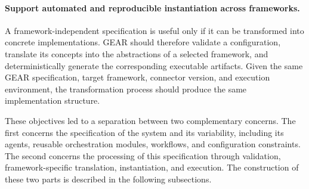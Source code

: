 \paragraph{\textbf{Support automated and reproducible instantiation
across frameworks.}}
A framework-independent specification is useful only if it can be
transformed into concrete implementations. GEAR should therefore validate a
configuration, translate its concepts into the abstractions of a selected
framework, and deterministically generate the corresponding executable
artifacts. Given the same GEAR specification, target framework, connector
version, and execution environment, the transformation process should
produce the same implementation structure.

These objectives led to a separation between two complementary concerns.
The first concerns the specification of the system and its variability,
including its agents, reusable orchestration modules, workflows, and
configuration constraints. The second concerns the processing of this
specification through validation, framework-specific translation,
instantiation, and execution. The construction of these two parts is
described in the following subsections.


